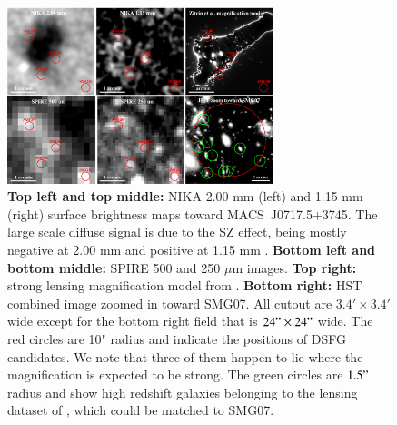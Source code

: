 \documentclass[11pt,a4paper,twoside,graphicx,color]{article}
\begin{document}
\begin{figure}[h!]
	\centering
	\includegraphics[width=0.69\textwidth]{MACSJ0717_multi.pdf}
	\caption{\footnotesize{{\bf Top left and top middle:} NIKA 2.00 mm (left) and 1.15 mm (right) surface brightness maps toward \mbox{MACS~J0717.5+3745}. The large scale diffuse signal is due to the SZ effect, being mostly negative at 2.00 mm and positive at 1.15 mm \citep{Adam2016b}. {\bf Bottom left and bottom middle:} SPIRE 500 and 250 $\mu$m images. {\bf Top right:} strong lensing magnification model from \cite{Zitrin2015}. {\bf Bottom right:} HST combined image zoomed in toward SMG07. All cutout are $3.4' \times 3.4'$ wide except for the bottom right field that is $24" \times 24"$ wide. The red circles are 10" radius and indicate the positions of DSFG candidates. We note that three of them happen to lie where the magnification is expected to be strong. The green circles are $1.5"$ radius and show high redshift galaxies belonging to the lensing dataset of \cite{Diego2015}, which could be matched to SMG07.}}
	\label{fig:maps1} 
\end{figure}
\end{document}
